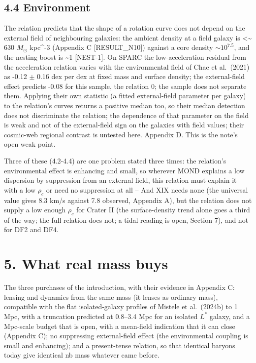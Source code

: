 \documentclass[
  10pt,
]{article}
\begin{document}
\subsection{4.4 Environment}

The relation predicts that the shape of a rotation curve
does not depend on the external field of neighbouring galaxies: the ambient density at a field galaxy is \textless{}\textasciitilde{} 630 $M_\odot$ kpc\^{}-3 (Appendix C {[}RESULT\_N10{]}) against a core density
$\sim 10^{7.5}$, and the nesting boost is \textasciitilde{}1
{[}NEST-1{]}. On SPARC the low-acceleration residual from the
acceleration relation varies with the environmental field of Chae et
al.~(2021) as -0.12 $\pm$ 0.16 dex per dex at fixed mass and surface
density; the external-field effect predicts -0.08 for this sample, the
relation 0; the sample does not separate them. Applying their own statistic
(a fitted external-field parameter per galaxy) to the relation's curves
returns a positive median too, so their median detection does not
discriminate the relation; the dependence of that parameter on the field is
weak and not of the external-field sign on the galaxies with field
values; their cosmic-web regional contrast is untested here. Appendix D.
This is the note's open weak point.

Three of these (4.2-4.4) are one problem stated three times: the relation's
environmental effect is enhancing and small, so wherever MOND explains a
low dispersion by suppression from an external field, this relation must
explain it with a low $\rho_c$ or need no suppression at all -- And XIX needs none (the universal value gives 8.3 km/s against 7.8 observed, Appendix A), but the relation does not supply a low enough $\rho_c$ for
Crater II (the surface-density trend alone goes a third of the way; the full relation does not; a tidal reading is open, Section 7), and not for DF2 and DF4.

\section{5. What real mass buys}\label{what-real-mass-buys}

The three purchases of the introduction, with their evidence in Appendix
C: lensing and dynamics from the same mass (it lenses as ordinary mass),
compatible with the flat isolated-galaxy profiles of Mistele et al.~(2024b) to 1 Mpc, with a truncation predicted at 0.8--3.4 Mpc for an isolated $L^*$ galaxy, and a Mpc-scale budget that is open, with a mean-field indication that it can close (Appendix C);
no suppressing external-field effect (the environmental coupling is
small and enhancing); and a present-tense relation, so that identical baryons
today give identical nb mass whatever came before.
\end{document}

